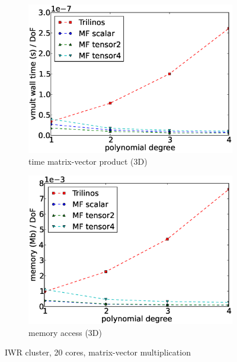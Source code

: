 \documentclass[AMA,STIX1COL]{WileyNJD-v2}
\begin{document}
\begin{figure}
\begin{subfigure}[b]{0.32\textwidth}
    \includegraphics[width=\textwidth]{IWR_newest_patched_timing3d.eps}
    \caption{time matrix-vector product (3D)}
    \label{fig:benchmark_miehe_IWR_vmult3}
  \end{subfigure}
  \begin{subfigure}[b]{0.32\textwidth}
    \centering
    \includegraphics[width=\textwidth]{IWR_newest_patched_memory3d.eps}
    \caption{memory access (3D)}
    \label{fig:benchmark_miehe_IWR_memory3}
  \end{subfigure}
  \caption{IWR cluster, 20 cores, matrix-vector multiplication}%
  \label{fig:benchmark_miehe_IWR}
\end{figure}
\end{document}
